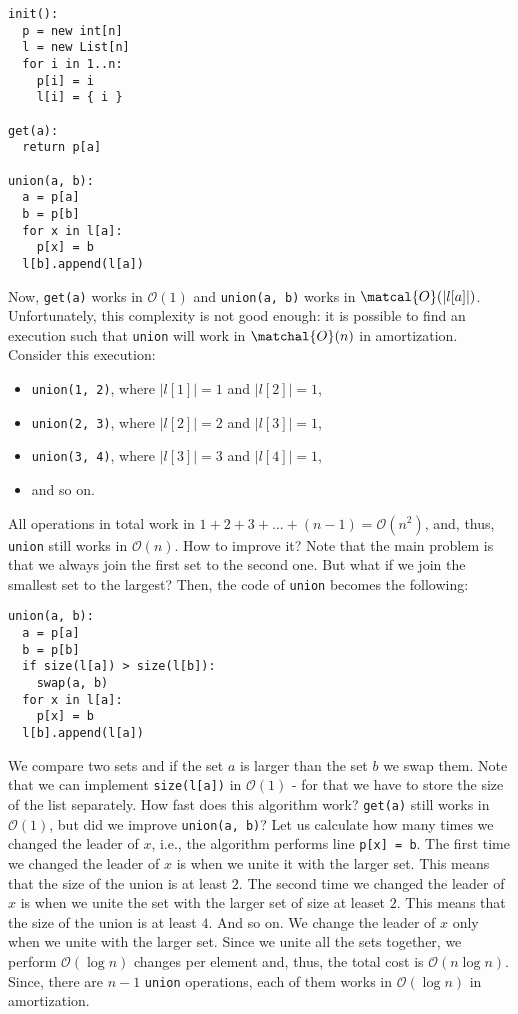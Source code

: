 \documentclass[11pt]{article}
\begin{document}
\begin{verbatim}
init():
  p = new int[n]
  l = new List[n]
  for i in 1..n:
    p[i] = i
    l[i] = { i }

get(a):
  return p[a]

union(a, b):
  a = p[a]
  b = p[b]
  for x in l[a]:
    p[x] = b
  l[b].append(l[a])
\end{verbatim}

Now, \texttt{get(a)} works in \(\mathcal{O}(1)\) and \texttt{union(a, b)} works in
\(\matcal{O}(|l[a]|)\). Unfortunately, this complexity is not good enough: it is possible to find an
execution such that \texttt{union} will work in \(\matchal{O}(n)\) in amortization. Consider this
execution:
\begin{itemize}
\item \texttt{union(1, 2)}, where \(|l[1]| = 1\) and \(|l[2]| = 1\),
\item \texttt{union(2, 3)}, where \(|l[2]| = 2\) and \(|l[3]| = 1\),
\item \texttt{union(3, 4)}, where \(|l[3]| = 3\) and \(|l[4]| = 1\),
\item and so on.
\end{itemize}

All operations in total work in \(1 + 2 + 3 + ... + (n - 1) = \mathcal{O}(n^2)\), and, thus, \texttt{union}
still works in \(\mathcal{O}(n)\). How to improve it? Note that the main problem is that we always
join the first set to the second one. But what if we join the smallest set to the largest? Then,
the code of \texttt{union} becomes the following:
\begin{verbatim}
union(a, b):
  a = p[a]
  b = p[b]
  if size(l[a]) > size(l[b]):
    swap(a, b)
  for x in l[a]:
    p[x] = b
  l[b].append(l[a])
\end{verbatim}

We compare two sets and if the set \(a\) is larger than the set \(b\) we swap them. Note that we can
implement \texttt{size(l[a])} in \(\mathcal{O}(1)\) - for that we have to store the size of the list
separately. How fast does this algorithm work? \texttt{get(a)} still works in \(\mathcal{O}(1)\), but did
we improve \texttt{union(a, b)}? Let us calculate how many times we changed the leader of \(x\), i.e., the
algorithm performs line \texttt{p[x] = b}. The first time we changed the leader of \(x\) is when we unite
it with the larger set. This means that the size of the union is at least \(2\). The second time we
changed the leader of \(x\) is when we unite the set with the larger set of size at leaset \(2\). This
means that the size of the union is at least \(4\). And so on. We change the leader of \(x\) only when
we unite with the larger set. Since we unite all the sets together, we perform \(\mathcal{O}(\log
  n)\) changes per element and, thus, the total cost is \(\mathcal{O}(n \log n)\). Since, there are
\(n - 1\) \texttt{union} operations, each of them works in \(\mathcal{O}(\log n)\) in amortization.
\end{document}
